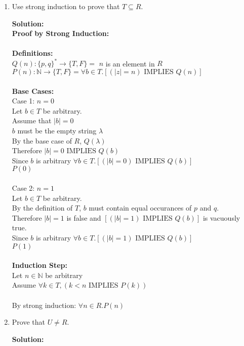 \documentclass[11pt]{article}
\def\nats {{\mathbb N}}
\newcommand{\Implies}{\mbox{ IMPLIES }}
\begin{document}
\begin{enumerate}
\item
\begin{question}
Use strong induction to prove that $T \subseteq R$.
\end{question}

\begin{solution}
{\bf Solution:}\\
{\bf Proof by Strong Induction: }\\\\
{\bf Definitions:}\\
$Q(n): \{p,q\}^*\rightarrow\{T,F\} = $ $n$ is an element in $R$\\
$P(n): \nats \rightarrow \{T,F\} = \forall b\in T.\left[(|z| = n) \Implies Q(n) \right]$\\\\
{\bf Base Cases: }\\
Case 1: $n=0$ \\
\null\quad Let $b\in T$ be arbitrary.\\
\null\qquad Assume that $|b| = 0$ \\
\null\qquad $b$ must be the empty string $\lambda$\\
\null\qquad By the base case of $R$, $Q(\lambda)$\\
\null\quad Therefore $|b|=0\Implies Q(b)$\\
Since $b$ is arbitrary $\forall b\in T.\left[(|b|=0)\Implies Q(b)\right]$\\
$P(0)$\\\\
Case 2: $n=1$ \\
\null\quad Let $b\in T$ be arbitrary.\\
\null\quad By the definition of $T$, $b$ must contain equal occurances of $p$ and $q$.\\
\null\quad Therefore $|b| = 1$ is false and $\left[(|b|=1)\Implies Q(b)\right]$ is vacuously true.\\
Since $b$ is arbitrary $\forall b\in T.\left[(|b|=1)\Implies Q(b)\right]$\\
$P(1)$\\\\
{\bf Induction Step: }\\
Let $n\in \nats$ be arbitrary\\
\null\quad Assume $\forall k\in T,\left(k<n \Implies P(k)\right)$\\
\null\quad
\\

By strong induction: $\forall n\in R. P(n)$\\
\end{solution}

\item
\begin{question}
Prove that $U \neq R$.
\end{question}

\begin{solution}
{\bf Solution:}\\

\end{solution}
\end{enumerate}
\end{document}
